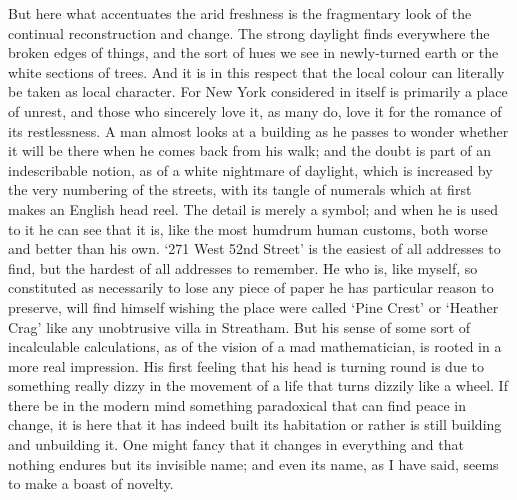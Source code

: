 \documentclass{book}
\begin{document}
But here what accentuates the arid freshness is the fragmentary look of the continual reconstruction and change. The strong daylight finds everywhere the broken edges of things, and the sort of hues we see in newly-turned earth or the white sections of trees. And it is in this respect that the local colour can literally be taken as local character. For New York considered in itself is primarily a place of unrest, and those who sincerely love it, as many do, love it for the romance of its restlessness. A man almost looks at a building as he passes to wonder whether it will be there when he comes back from his walk; and the doubt is part of an indescribable notion, as of a white nightmare of daylight, which is increased by the very numbering of the streets, with its tangle of numerals which at first makes an English head reel. The detail is merely a symbol; and when he is used to it he can see that it is, like the most humdrum human customs, both worse and better than his own. ‘271 West 52nd Street’ is the easiest of all addresses to find, but the hardest of all addresses to remember. He who is, like myself, so constituted as necessarily to lose any piece of paper he has particular reason to preserve, will find himself wishing the place were called ‘Pine Crest’ or ‘Heather Crag’ like any unobtrusive villa in Streatham. But his sense of some sort of incalculable calculations, as of the vision of a mad mathematician, is rooted in a more real impression. His first feeling that his head is turning round is due to something really dizzy in the movement of a life that turns dizzily like a wheel. If there be in the modern mind something paradoxical that can find peace in change, it is here that it has indeed built its habitation or rather is still building and unbuilding it. One might fancy that it changes in everything and that nothing endures but its invisible name; and even its name, as I have said, seems to make a boast of novelty.
\end{document}

